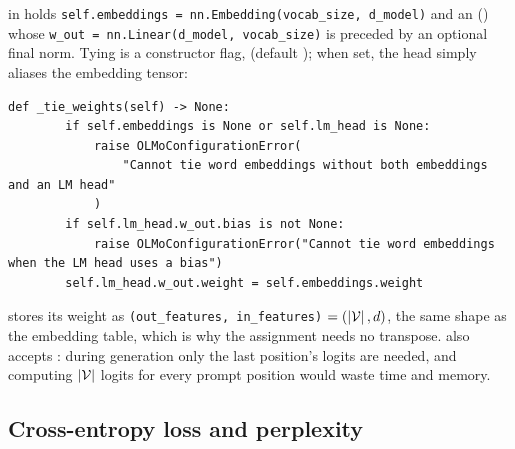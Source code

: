 \begin{implnote}[title={In the code: embeddings and the tied head in OLMo-core}]
 in 
holds \texttt{self.embeddings = nn.Embedding(vocab\_size, d\_model)} and an 
() whose
\texttt{w\_out = nn.Linear(d\_model, vocab\_size)} is preceded by an optional final norm. Tying
is a constructor flag,  (default ); when set, the
head simply aliases the embedding tensor:
\begin{lstlisting}[caption={Excerpt from \texttt{repos/\allowbreak allenai\_\_OLMo-core/\allowbreak src/\allowbreak olmo\_core/\allowbreak nn/\allowbreak transformer/\allowbreak model.py}},label={lst:c01-olmo-tie}]
    def _tie_weights(self) -> None:
        if self.embeddings is None or self.lm_head is None:
            raise OLMoConfigurationError(
                "Cannot tie word embeddings without both embeddings and an LM head"
            )
        if self.lm_head.w_out.bias is not None:
            raise OLMoConfigurationError("Cannot tie word embeddings when the LM head uses a bias")
        self.lm_head.w_out.weight = self.embeddings.weight
\end{lstlisting}
 stores its weight as \texttt{(out\_features, in\_features)}
$= (\left\lvert \mathcal{V}\right\rvert, d)$, the same shape as the embedding table, which is why the
assignment needs no transpose.  also accepts
: during generation only the last position's logits are needed, and
computing $\left\lvert \mathcal{V}\right\rvert$ logits for every prompt position would waste time and memory.
\end{implnote}

\subsection{Cross-entropy loss and perplexity}\label{sec:c01-loss}

